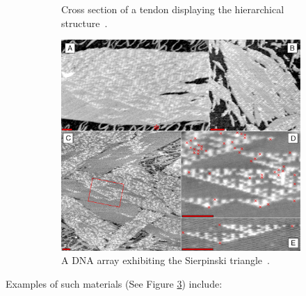 \begin{figure}
\begin{subfigure}{.40\linewidth}
  \caption{Cross section of a tendon displaying the hierarchical structure~\cite{lecture_biosolid_mechanics}.}
  \label{fig:material_examples:tendon}
\end{subfigure}\hfill
\begin{subfigure}{.30\linewidth}\centering
  \includegraphics[width=\linewidth]{img/Rothemund-DNA-SierpinskiGasket}
  \caption{A DNA array exhibiting the Sierpinski triangle~\cite{wikimediacommons2007dna}.}
  \label{fig:material_examples:sierpinski}
\end{subfigure}
\caption{}\label{fig:material_examples}
\end{figure}


Examples of such materials (See Figure \ref{fig:material_examples})
include:

